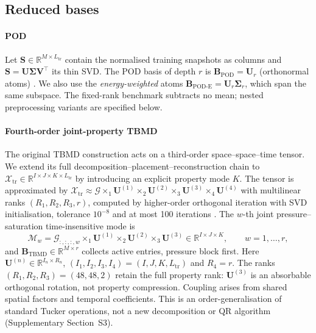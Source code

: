 \subsection{Reduced bases}
\label{sec:bases}
\paragraph{POD} Let $\mathbf{S}\in\mathbb{R}^{M\times L_{\mathrm{tr}}}$ contain the normalised training snapshots as columns and $\mathbf{S}=\mathbf{U}\boldsymbol{\Sigma}\mathbf{V}^\top$ its thin SVD. The POD basis of depth $r$ is $\mathbf{B}_{\mathrm{POD}}=\mathbf{U}_r$ (orthonormal atoms) \cite{berkooz1993}. We also use the \emph{energy-weighted} atoms $\mathbf{B}_{\mathrm{POD\text{-}E}}=\mathbf{U}_r\boldsymbol{\Sigma}_r$, which span the same subspace. The fixed-rank benchmark subtracts no mean; nested preprocessing variants are specified below.

\paragraph{Fourth-order joint-property TBMD} The original TBMD construction \cite{zhong2024tbmd} acts on a third-order space--space--time tensor. We extend its full decomposition--placement--reconstruction chain to $\mathcal{X}_{\mathrm{tr}}\in\mathbb{R}^{I\times J\times K\times L_{\mathrm{tr}}}$ by introducing an explicit property mode $K$. The tensor is approximated by $\mathcal{X}_{\mathrm{tr}}\approx\mathcal{G}\times_1\mathbf{U}^{(1)}\times_2\mathbf{U}^{(2)}\times_3\mathbf{U}^{(3)}\times_4\mathbf{U}^{(4)}$ with multilinear ranks $(R_1,R_2,R_3,r)$, computed by higher-order orthogonal iteration with SVD initialisation, tolerance $10^{-8}$ and at most 100 iterations \cite{delathauwer2000,kolda2009,kossaifi2019}. The $w$-th joint pressure--saturation time-insensitive mode is
\begin{equation}
\mathcal{M}_w=\mathcal{G}_{:,:,:,w}\times_1\mathbf{U}^{(1)}\times_2\mathbf{U}^{(2)}\times_3\mathbf{U}^{(3)}\in\mathbb{R}^{I\times J\times K},\qquad w=1,\dots,r,
\label{eq:tbmd_modes}
\end{equation}
and $\mathbf{B}_{\mathrm{TBMD}}\in\mathbb{R}^{M\times r}$ collects active entries, pressure block first. Here $\mathbf{U}^{(n)}\in\mathbb{R}^{I_n\times R_n}$, $(I_1,I_2,I_3,I_4)=(I,J,K,L_{\mathrm{tr}})$ and $R_4=r$. The ranks $(R_1,R_2,R_3)=(48,48,2)$ retain the full property rank: $\mathbf{U}^{(3)}$ is an absorbable orthogonal rotation, not property compression. Coupling arises from shared spatial factors and temporal coefficients. This is an order-generalisation of standard Tucker operations, not a new decomposition or QR algorithm (Supplementary Section~S3).

